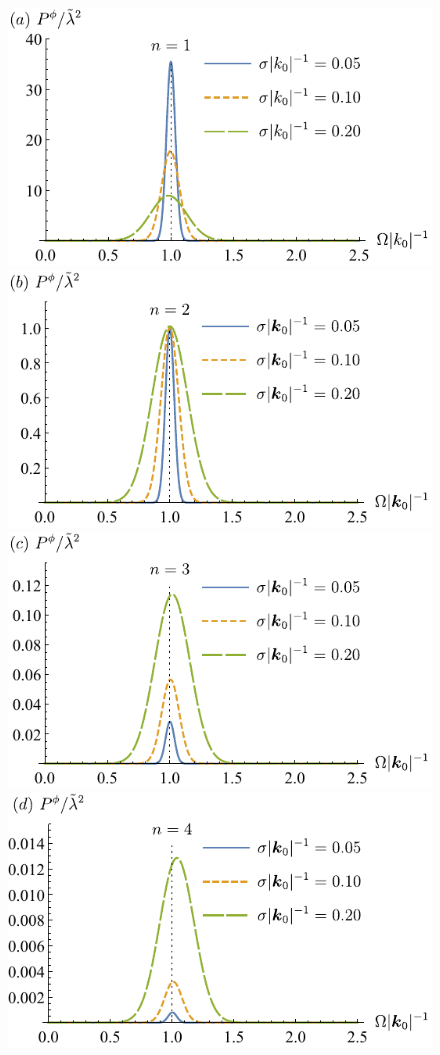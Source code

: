 \documentclass[11pt,prd,onecolumn,superscriptaddress,nofootinbib,floatfix,amsmath,amssymb]{revtex4-2}
\begin{document}
    \begin{figure}[tp]
        \includegraphics[scale=0.8]{Fig1a.pdf}
        \includegraphics[scale=0.8]{Fig1b.pdf}
        \includegraphics[scale=0.8]{Fig1c.pdf}
        \includegraphics[scale=0.8]{Fig1d.pdf}

\end{figure}
\end{document}
